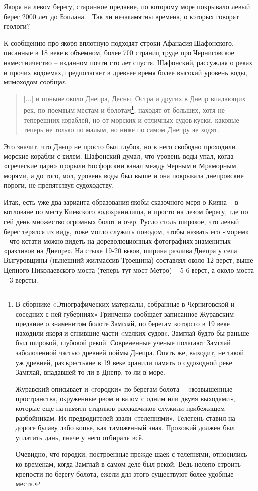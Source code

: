 Якоря на левом берегу, старинное предание, по которому море покрывало левый берег 2000 лет до Боплана... Так ли незапамятны времена, о которых говорят геологи?

К сообщению про якоря вплотную подходят строки Афанасия Шафонского, писанные в 18 веке в объемном, более 700 страниц труде про Черниговское наместничес\-тво\cite[стр. 6]{ochernignamest} – изданном почти сто лет спустя. Шафонский, рассуждая о реках и прочих водоемах, предполагает в древнее время более высокий уровень воды, мимоходом сообщая:

\begin{quotation}
[...] и поныне около Днепра, Десны, Остра и других в Днепр впадающих рек, по поемным местам и болотам\footnote{В сборнике «Этнографических материалы, собранные в Черниговской и соседних с ней губерниях» Гринченко\cite{grinetnochern} сообщает записанное Журавским предание о знаменитом болоте Замглай, по берегам которого в 19 веке находили якоря и сгнившие части «мелких судов». Замглай будто бы раньше был широкой, глубокой рекой. Современные ученые полагают Замглай заболоченной частью древней поймы Днепра. Опять же, выходит, не такой уж древней, раз крестьяне в 19 веке хранили память о судоходной реке Замглай, впадавшей то ли в Днепр, то ли в море.

Журавский описывает и «городки» по берегам болота – «возвышенные пространства, окруженные рвом и валом с одним или двумя выходами», которые еще на памяти стариков-рассказчиков служили прибежищем разбойникам. Их предводителей звали «телепнями». Телепень ставил на дороге булаву либо копье, как таможенный знак. Прохожий должен был уплатить дань, иначе у него отбирали всё.

Очевидно, что городки, построенные прежде шаек с телепнями, относились ко временам, когда Замглай в самом деле был рекой. Ведь нелепо строить крепости по берегу болота, ежели для этого существуют более удобные места.}, находят от больших, хотя не теперешних кораблей, но от морских и отличных судов куски, каковые теперь не только по малым, но ниже по самом Днепру не ходят.
\end{quotation}

Это значит, что Днепр не просто был глубок, но в него свободно проходили морские корабли с килем. Шафонский думал, что уровень воды упал, когда «греческие цари» прорыли Босфорский канал между Черным и Мраморным морями, а до того, мол, уровень воды был выше и она покрывала днепровские пороги, не препятствуя судоходству.

Итак, есть уже два варианта образования якобы сказочного моря-о-Кияна – в котловане по месту Киевского водохранилища, и просто на левом берегу, где по сей день множество огромных болот и озер. Русло столь широкое, что левый берег терялся из виду, тоже могло служить поводом, чтобы назвать его «морем» – что кстати можно видеть на дореволюционных фотографиях знаменитых «разливов на Днепре». На стыке 19-20 веков, ширина разлива Днепра у села Выгуровщины (нынешний жилмассив Троещина) составлял около 12 верст, выше Цепного Николаевского моста (теперь тут мост Метро) – 5-6 верст, а около моста – 3 версты.

